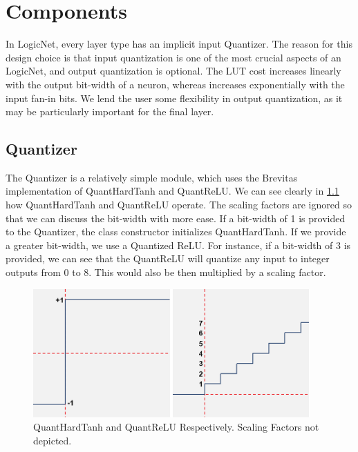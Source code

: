 \chapter{Components}\label{ch:components}
In LogicNet, every layer type has an implicit input Quantizer. The reason for this design choice is that input quantization is one of the most crucial aspects of an LogicNet, and output quantization is optional. The LUT cost increases linearly with the output bit-width of a neuron, whereas increases exponentially with the input fan-in bits. We lend the user some flexibility in output quantization, as it may be particularly important for the final layer. 
\section{Quantizer}
The Quantizer is a relatively simple module, which uses the Brevitas implementation of QuantHardTanh and QuantReLU. We can see clearly in \cref{fig:qhtanhqrelu} how QuantHardTanh and QuantReLU operate. The scaling factors are ignored so that we can discuss the bit-width with more ease.
If a bit-width of 1 is provided to the Quantizer, the class constructor initializes QuantHardTanh. If we provide a greater bit-width, we use a Quantized ReLU. For instance, if a bit-width of $3$ is provided, we can see that the QuantReLU will quantize any input to integer outputs from $0$ to $8$. This would also be then multiplied by a scaling factor. 
\begin{figure}[h]
    \centering
    \includegraphics[width=300pt]{figures/bison/qhtanhqrelu.png}
    \caption{QuantHardTanh and QuantReLU Respectively. Scaling Factors not depicted.}
    \label{fig:qhtanhqrelu}
\end{figure}
    
